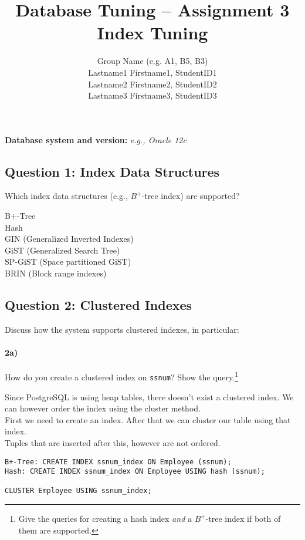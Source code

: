 \documentclass[11pt]{scrartcl}
\title{
  \textbf{\large Database Tuning -- Assignment 3}\\
  Index Tuning
}
\author{
 Group Name (e.g. A1, B5, B3)\\
 \large Lastname1 Firstname1, StudentID1 \\
 \large Lastname2 Firstname2, StudentID2 \\
 \large Lastname3 Firstname3, StudentID3 
}
\begin{document}
\maketitle

\medskip

\noindent\textbf{Database system and version:} {\it e.g., Oracle 12c}

\subsection*{Question 1: Index Data Structures} Which index data structures (e.g., $B^+$-tree
index) are supported?

\smallskip

B+-Tree\\
Hash\\
GIN (Generalized Inverted Indexes)\\
GiST (Generalized Search Tree)\\
SP-GiST (Space partitioned GiST)\\
BRIN (Block range indexes)

\subsection*{Question 2: Clustered Indexes} Discuss how the system
supports clustered indexes, in particular:

\paragraph{2a)} How do you create a clustered index on {\tt ssnum}?
Show the query.\footnote{Give the queries for creating a hash index
  \emph{and} a $B^+$-tree index if both of them are supported.}

\smallskip
Since PostgreSQL is using heap tables, there doesn't exist a clustered index. We can however order the index using the cluster method.\\
First we need to create an index. After that we can cluster our table using that index.\\
Tuples that are inserted after this, however are not ordered.

{\small
\begin{verbatim}
B+-Tree: CREATE INDEX ssnum_index ON Employee (ssnum);
Hash: CREATE INDEX ssnum_index ON Employee USING hash (ssnum);

CLUSTER Employee USING ssnum_index;
\end{verbatim}
}
\end{document}
